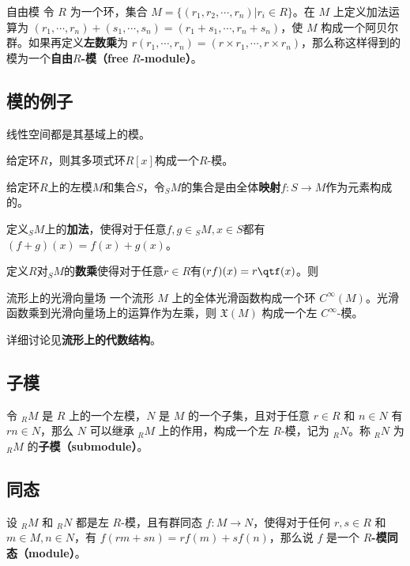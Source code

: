 \begin{definition}{自由模}
令 $R$ 为一个环，集合 $M=\{(r_1, r_2, \cdots, r_n)|r_i\in R\}$。在 $M$ 上定义加法运算为 $(r_1, \cdots, r_n)+(s_1, \cdots, s_n)=(r_1+s_1, \cdots, r_n+s_n)$，使 $M$ 构成一个阿贝尔群。如果再定义\textbf{左数乘}为 $r(r_1, \cdots, r_n)=(r\times r_1, \cdots, r\times r_n)$，那么称这样得到的模为一个\textbf{自由}$R$\textbf{-模（free} $R$\textbf{-module）}。
\end{definition}





\subsection{模的例子}

\begin{example}{}
线性空间都是其基域上的模。
\end{example}

\begin{example}{}
给定环$R$，则其多项式环$R[x]$构成一个$R$-模。
\end{example}


\begin{example}{}

给定环$R$上的左模$M$和集合$S$，令$_SM$的集合是由全体\textbf{映射}$f:S\to M$作为元素构成的。

定义$_SM$上的\textbf{加法}，使得对于任意$f, g\in \phantom{}_SM, x\in S$都有$(f+g)(x)=f(x)+g(x)$。

定义$R$对$_SM$的\textbf{数乘}使得对于任意$r\in R$有$(rf)(x)=r\qtf(x)$。则

\end{example}

\begin{example}{流形上的光滑向量场}
一个流形 $M$ 上的全体光滑函数构成一个环 $C^{\infty}(M)$。光滑函数乘到光滑向量场上的运算作为左乘，则 $\mathfrak{X}(M)$ 构成一个左 $C^{\infty}$-模。

详细讨论见\textbf{流形上的代数结构}。
\end{example}


\subsection{子模}

令 $_RM$ 是 $R$ 上的一个左模，$N$ 是 $M$ 的一个子集，且对于任意 $r\in R$ 和 $n\in N$ 有 $rn\in N$，那么 $N$ 可以继承 $_RM$ 上的作用，构成一个左 $R$-模，记为 $_RN$。称 $_RN$ 为 $_RM$ 的\textbf{子模（submodule）}。


\subsection{同态}

设 $_RM$ 和 $_RN$ 都是左 $R$-模，且有群同态 $f:M\to N$，使得对于任何 $r, s\in R$ 和 $m\in M, n\in N$，有 $f(rm+sn)=rf(m)+sf(n)$，那么说 $f$ 是一个 $R$\textbf{-模同态（module）}。











